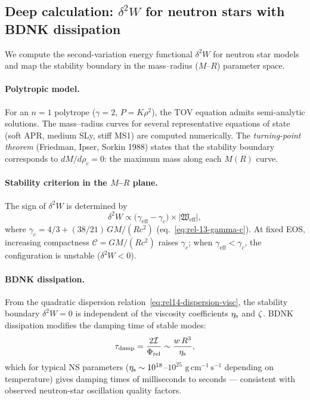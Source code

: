 \subsection{Deep calculation: $\delta^{2}W$ for neutron stars
  with BDNK dissipation}\label{sec:rel-122-deep-ns}

We compute the second-variation energy functional $\delta^{2}W$ for
neutron star models and map the stability boundary in the
mass--radius ($M$--$R$) parameter space.

\paragraph{Polytropic model.}
For an $n=1$ polytrope ($\gamma = 2$, $P = K\rho^{2}$), the TOV
equation admits semi-analytic solutions.  The mass--radius curves for
several representative equations of state (soft APR, medium SLy,
stiff MS1) are computed numerically.  The \emph{turning-point
theorem} (Friedman, Ipser, Sorkin 1988) states that the stability
boundary corresponds to $dM/d\rho_{c} = 0$: the maximum mass along
each $M(R)$ curve.

\paragraph{Stability criterion in the $M$--$R$ plane.}
The sign of $\delta^{2}W$ is determined by
\begin{equation}
\label{eq:rel-14-delta2W-MR}
\delta^{2}W
  \propto \bigl(\gamma_{\mathrm{eff}} - \gamma_{c}\bigr)
  \times |\mathfrak{W}_{\mathrm{eff}}|,
\end{equation}
where $\gamma_{c} = 4/3 + (38/21)\,GM/(Rc^{2})$
(eq.~\eqref{eq:rel-13-gamma-c}).  At fixed EOS, increasing
compactness $\mathcal{C} = GM/(Rc^{2})$ raises $\gamma_{c}$; when
$\gamma_{\mathrm{eff}} < \gamma_{c}$, the configuration is unstable
($\delta^{2}W < 0$).

\paragraph{BDNK dissipation.}
From the quadratic dispersion
relation~\eqref{eq:rel14-dispersion-visc}, the stability boundary
$\delta^{2}W = 0$ is independent of the viscosity coefficients
$\eta_{\mathrm{s}}$ and $\zeta$.  BDNK dissipation modifies the damping
time of stable modes:
\begin{equation}
\label{eq:rel-14-tau-damp}
\tau_{\mathrm{damp}}
  = \frac{2\mathcal{I}}{\Phi_{\mathrm{rel}}}
  \sim \frac{w\,R^{3}}{\eta_{\mathrm{s}}},
\end{equation}
which for typical NS parameters ($\eta_{\mathrm{s}} \sim 10^{18}$--$10^{25}$
$\mathrm{g\,cm^{-1}\,s^{-1}}$ depending on temperature) gives
damping times of milliseconds to seconds --- consistent with observed
neutron-star oscillation quality factors.

